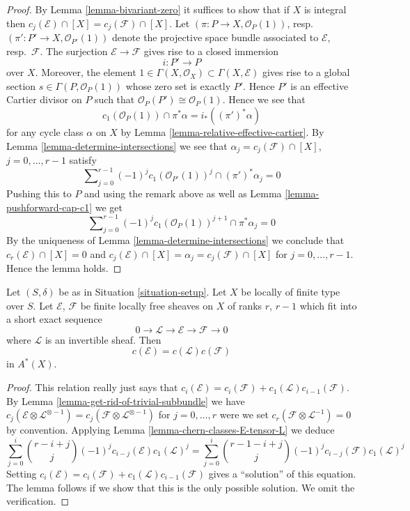 \begin{proof}
By Lemma \ref{lemma-bivariant-zero}
it suffices to show that if $X$ is integral
then $c_j(\mathcal{E}) \cap [X] = c_j(\mathcal{F}) \cap [X]$.
Let $(\pi : P \to X, \mathcal{O}_P(1))$,
resp.\ $(\pi' : P' \to X, \mathcal{O}_{P'}(1))$ denote the
projective space bundle associated to $\mathcal{E}$, resp.\ $\mathcal{F}$.
The surjection $\mathcal{E} \to \mathcal{F}$ gives rise
to a closed immersion
$$
i : P' \longrightarrow P
$$
over $X$. Moreover, the element
$1 \in \Gamma(X, \mathcal{O}_X) \subset \Gamma(X, \mathcal{E})$
gives rise to a global section $s \in \Gamma(P, \mathcal{O}_P(1))$
whose zero set is exactly $P'$. Hence $P'$ is an effective Cartier
divisor on $P$ such that $\mathcal{O}_P(P') \cong \mathcal{O}_P(1)$.
Hence we see that
$$
c_1(\mathcal{O}_P(1)) \cap \pi^*\alpha = i_*((\pi')^*\alpha)
$$
for any cycle class $\alpha$ on $X$ by
Lemma \ref{lemma-relative-effective-cartier}.
By Lemma \ref{lemma-determine-intersections} we see that
$\alpha_j = c_j(\mathcal{F}) \cap [X]$, $j = 0, \ldots, r - 1$
satisfy
$$
\sum\nolimits_{j = 0}^{r - 1} (-1)^jc_1(\mathcal{O}_{P'}(1))^j
\cap (\pi')^*\alpha_j = 0
$$
Pushing this to $P$ and using the remark above as well as
Lemma \ref{lemma-pushforward-cap-c1} we get
$$
\sum\nolimits_{j = 0}^{r - 1}
(-1)^j c_1(\mathcal{O}_P(1))^{j + 1}
\cap \pi^*\alpha_j = 0
$$
By the uniqueness of Lemma \ref{lemma-determine-intersections}
we conclude that
$c_r(\mathcal{E}) \cap [X] = 0$ and
$c_j(\mathcal{E}) \cap [X] = \alpha_j = c_j(\mathcal{F}) \cap [X]$
for $j = 0, \ldots, r - 1$. Hence the lemma holds.
\end{proof}

\begin{lemma}
\label{lemma-additivity-invertible-subsheaf}
Let $(S, \delta)$ be as in Situation \ref{situation-setup}.
Let $X$ be locally of finite type over $S$.
Let $\mathcal{E}$, $\mathcal{F}$ be finite locally free sheaves
on $X$ of ranks $r$, $r - 1$ which fit into a short
exact sequence
$$
0 \to \mathcal{L} \to \mathcal{E} \to \mathcal{F} \to 0
$$
where $\mathcal{L}$ is an invertible sheaf.
Then
$$
c(\mathcal{E}) = c(\mathcal{L}) c(\mathcal{F})
$$
in $A^*(X)$.
\end{lemma}

\begin{proof}
This relation really just says that
$c_i(\mathcal{E}) = c_i(\mathcal{F}) + c_1(\mathcal{L})c_{i - 1}(\mathcal{F})$.
By Lemma \ref{lemma-get-rid-of-trivial-subbundle}
we have $c_j(\mathcal{E} \otimes \mathcal{L}^{\otimes -1})
= c_j(\mathcal{F} \otimes \mathcal{L}^{\otimes -1})$ for
$j = 0, \ldots, r$ were we set
$c_r(\mathcal{F} \otimes \mathcal{L}^{-1}) = 0$ by convention.
Applying Lemma \ref{lemma-chern-classes-E-tensor-L} we deduce
$$
\sum_{j = 0}^i
\binom{r - i + j}{j} (-1)^j c_{i - j}({\mathcal E}) c_1({\mathcal L})^j
=
\sum_{j = 0}^i
\binom{r - 1 - i + j}{j} (-1)^j c_{i - j}({\mathcal F}) c_1({\mathcal L})^j
$$
Setting
$c_i(\mathcal{E}) = c_i(\mathcal{F}) + c_1(\mathcal{L})c_{i - 1}(\mathcal{F})$
gives a ``solution'' of this equation. The lemma follows if we show
that this is the only possible solution. We omit the verification.
\end{proof}

